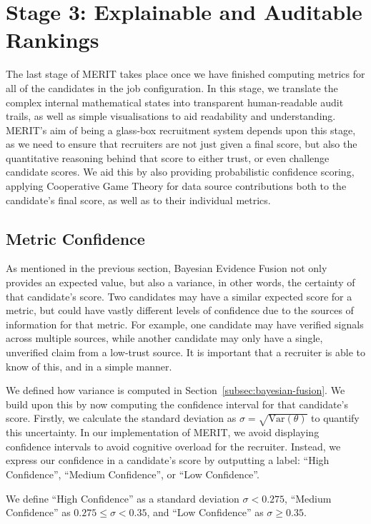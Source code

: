 \section{Stage 3: Explainable and Auditable Rankings}
The last stage of MERIT takes place once we have finished computing metrics for all of the candidates in the job configuration.
In this stage, we translate the complex internal mathematical states into transparent human-readable audit trails, as well as
simple visualisations to aid readability and understanding. MERIT's aim of being a glass-box recruitment system depends upon this stage,
as we need to ensure that recruiters are not just given a final score, but also the quantitative reasoning behind that score to either
trust, or even challenge candidate scores. We aid this by also providing probabilistic confidence scoring, applying Cooperative Game
Theory for data source contributions both to the candidate's final score, as well as to their individual metrics.

\subsection{Metric Confidence}
As mentioned in the previous section, Bayesian Evidence Fusion not only provides an expected value, but also a variance, in other words,
the certainty of that candidate's score. Two candidates may have a similar expected score for a metric, but could have vastly different
levels of confidence due to the sources of information for that metric. For example, one candidate may have verified signals across multiple
sources, while another candidate may only have a single, unverified claim from a low-trust source. It is important that a recruiter is able
to know of this, and in a simple manner.

We defined how variance is computed in Section~\ref{subsec:bayesian-fusion}. We build upon this by now computing 
the confidence interval for that candidate's score.
Firstly, we calculate the standard deviation as $\sigma = \sqrt{\text{Var}(\theta)}$ to quantify this uncertainty. In our implementation of
MERIT, we avoid displaying confidence intervals to avoid cognitive overload for the recruiter. Instead, we express our confidence in a candidate's
score by outputting a label: ``High Confidence'', ``Medium Confidence'', or ``Low Confidence''.

We define ``High Confidence'' as a standard deviation $\sigma < 0.275$, ``Medium Confidence'' as $0.275 \le \sigma < 0.35$, and
``Low Confidence'' as $\sigma \ge 0.35$.

